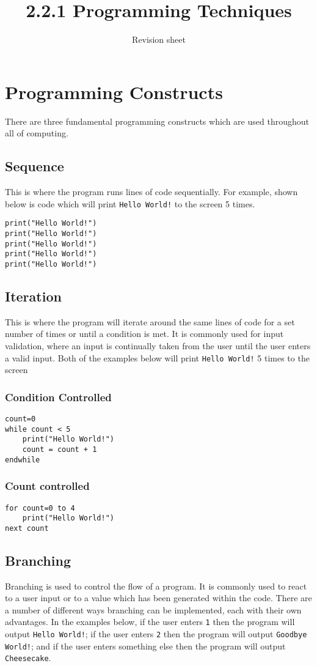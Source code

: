 \documentclass[a4paper,11pt, twocolumn]{article}
\title{2.2.1 Programming Techniques}
\author{Revision sheet}
\date{}
\begin{document}
\maketitle
\thispagestyle{fancy}

\section{Programming Constructs}
There are three fundamental programming constructs which are used throughout all of computing.
\subsection{Sequence}
This is where the program runs lines of code sequentially. For example, shown below is code which will print \verb|Hello World!| to the screen 5 times.
\begin{Verbatim}[breaklines=true, breakanywhere=true]
print("Hello World!")
print("Hello World!")
print("Hello World!")
print("Hello World!")
print("Hello World!")
\end{Verbatim}
\subsection{Iteration}
This is where the program will iterate around the same lines of code for a set number of times or until a condition is met. It is commonly used for input validation, where an input is continually taken from the user until the user enters a valid input. Both of the examples below will print \verb|Hello World!| 5 times to the screen
\subsubsection{Condition Controlled}
\begin{Verbatim}[breaklines=true, breakanywhere=true]
count=0
while count < 5
    print("Hello World!")
    count = count + 1
endwhile
\end{Verbatim}
\subsubsection{Count controlled}
\begin{Verbatim}[breaklines=true, breakanywhere=true]
for count=0 to 4
    print("Hello World!")
next count
\end{Verbatim}
\subsection{Branching}
Branching is used to control the flow of a program. It is commonly used to react to a user input or to a value which has been generated within the code. There are a number of different ways branching can be implemented, each with their own advantages. In the examples below, if the user enters \verb|1| then the program will output \verb|Hello World!|; if the user enters \verb|2| then the program will output \verb|Goodbye World!|; and if the user enters something else then the program will output \verb|Cheesecake|.
\end{document}

